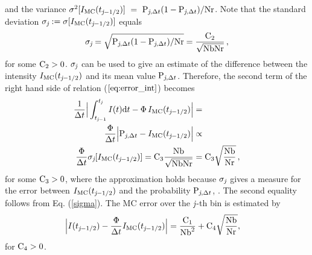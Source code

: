and the variance $\sigma^2[I_{\textrm{MC}}(t_{\textit{j}-1/2})] ~=~ \textrm{P}_{\textit{j}, \Delta t}(1-\textrm{P}_{\textit{j}, \Delta t})/\textrm{Nr}$.
Note that the standard deviation $\sigma_{\textit{j}}:=\sigma[I_{\textrm{MC}}(t_{\textit{j}-1/2})]$ equals
\begin{equation}\label{sigma}
\sigma_{\textit{j}}= \sqrt{\textrm{P}_{\textit{j}, \Delta t}(1-\textrm{P}_{\textit{j}, \Delta t})/\textrm{Nr}}= \frac{\textrm{C}_2}{\sqrt{\textrm{Nb}\textrm{Nr}}}\,, \end{equation}
 for some $\textrm{C}_{2}>0$. $\sigma_{\textit{j}}$ can be used to give an estimate of the difference between the intensity $I_{\textrm{MC}}(t_{\textit{j}-1/2})$ and its mean value $\textrm{P}_{\textit{j}, \Delta t}$.
Therefore, the second term of the right hand side of relation ($\ref{eq:error_int}$) becomes
\begin{equation}\begin{aligned}
\frac{1}{\Delta t}\Big|\int_{t_{\textit{j}-1}}^{t_{\textit{j}}} I(t)\textrm{d}t -
\Phi\, I_{\textrm{MC}}(t_{\textit{j}-1/2})\Big| &=  \\
\frac{\Phi}{\Delta t}\Big|\textrm{P}_{\textit{j}, \Delta t} -I_{\textrm{MC}}(t_{\textit{j}-1/2})\Big| &\propto  \\
  \frac{\Phi}{\Delta t}
\sigma_{\textit{j}}[I_{\textrm{MC}}(t_{\textit{j}-1/2})]=\textrm{C}_3\frac{\textrm{Nb}}{\sqrt{\textrm{Nb}\textrm{Nr}}} & = \textrm{C}_3\sqrt{\frac{\textrm{Nb}}{\textrm{Nr}}}\,,
\end{aligned}
\end{equation}
for some $\textrm{C}_3>0$, where the approximation holds because $\sigma_{\textit{j}}$ gives a measure for the error between
$I_{\textrm{MC}}(t_{\textit{j}-1/2})$ and the probability $\textrm{P}_{\textit{j}, \Delta t}$, \cite{diez2012openintro}. The second equality follows from Eq. (\ref{sigma}). The MC error over the $\textit{j}$-th bin is estimated by
\begin{equation} \begin{aligned}
\Big|I(t_{\textit{j}-1/2})&-\frac{\Phi}
{\Delta t}I_{\textrm{MC}}(t_{\textit{j}-1/2})\Big| =
\frac{\textrm{C}_1}{\textrm{Nb}^2} + \textrm{C}_4\sqrt{\frac{\textrm{Nb}}{\textrm{Nr}}},
\end{aligned}
\end{equation}
for $\textrm{C}_4>0$.
